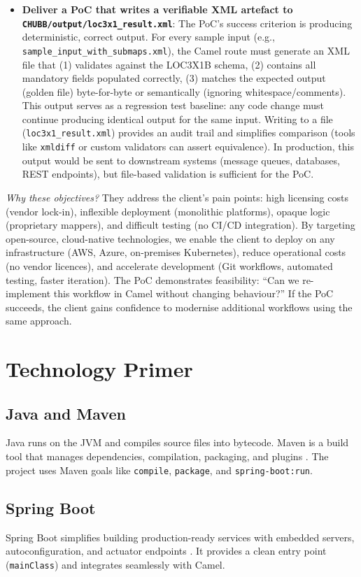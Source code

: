 \documentclass[11pt]{article}
\begin{document}
\begin{itemize}
  \item \textbf{Deliver a PoC that writes a verifiable XML artefact to \texttt{CHUBB/output/loc3x1\_result.xml}}: The PoC's success criterion is producing deterministic, correct output. For every sample input (e.g., \texttt{sample\_input\_with\_submaps.xml}), the Camel route must generate an XML file that (1) validates against the LOC3X1B schema, (2) contains all mandatory fields populated correctly, (3) matches the expected output (golden file) byte-for-byte or semantically (ignoring whitespace/comments). This output serves as a regression test baseline: any code change must continue producing identical output for the same input. Writing to a file (\texttt{loc3x1\_result.xml}) provides an audit trail and simplifies comparison (tools like \texttt{xmldiff} or custom validators can assert equivalence). In production, this output would be sent to downstream systems (message queues, databases, REST endpoints), but file-based validation is sufficient for the PoC.
\end{itemize}

\noindent\emph{Why these objectives?} They address the client's pain points: high licensing costs (vendor lock-in), inflexible deployment (monolithic platforms), opaque logic (proprietary mappers), and difficult testing (no CI/CD integration). By targeting open-source, cloud-native technologies, we enable the client to deploy on any infrastructure (AWS, Azure, on-premises Kubernetes), reduce operational costs (no vendor licences), and accelerate development (Git workflows, automated testing, faster iteration). The PoC demonstrates feasibility: ``Can we re-implement this workflow in Camel without changing behaviour?'' If the PoC succeeds, the client gains confidence to modernise additional workflows using the same approach.

\section{Technology Primer}
\subsection{Java and Maven}
Java runs on the JVM and compiles source files into bytecode. Maven is a build tool that manages dependencies, compilation, packaging, and plugins \cite{maven-docs}. The project uses Maven goals like \texttt{compile}, \texttt{package}, and \texttt{spring-boot:run}. 

\subsection{Spring Boot}
Spring Boot simplifies building production-ready services with embedded servers, autoconfiguration, and actuator endpoints \cite{spring-boot}. It provides a clean entry point (\texttt{mainClass}) and integrates seamlessly with Camel. 
\end{document}
